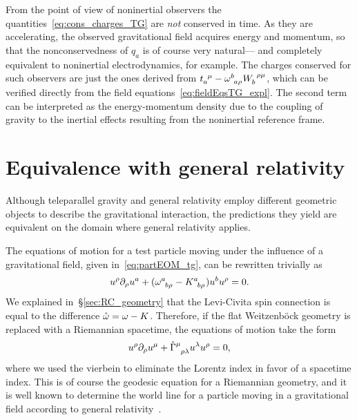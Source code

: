 \documentclass[
final,
11pt,
a4paper,
DIV=11,
headinclude=true,
footinclude=false,
bibliography=totoc,
twoside=true,  %
BCOR=5mm
]{scrbook}
\begin{document}
From the point of view of noninertial observers the 
quantities~\eqref{eq:cons_charges_TG} are \emph{not} conserved in 
time. As they are accelerating, the observed gravitational field 
acquires energy and momentum, so that the nonconservedness of 
$q_a$ is of course very natural--- and completely equivalent to 
noninertial electrodynamics, for example. The charges conserved 
for such observers are just the ones derived from $t\ind{_a^\mu} 
- \omega\ind{^b_{a\rho}} W\ind{_b^{\rho\mu}}$, which can be 
verified directly from the field 
equations~\eqref{eq:fieldEqsTG_expl}. The second term can be 
interpreted as the energy-momentum density due to the coupling of 
gravity to the inertial effects resulting from the noninertial 
reference frame.


\section{Equivalence with general relativity}
\label{sec:equiv_TG_GR}

Although teleparallel gravity and general relativity employ 
different geometric objects to describe the gravitational 
interaction, the predictions they yield are equivalent on the 
domain where general relativity applies.

The equations of motion for a test particle moving under the 
influence of a gravitational field, given 
in~\eqref{eq:partEOM_tg}, can be rewritten trivially as 
\begin{equation*}
  u^\rho \pd_\rho u^a + ( \omega\ind{^a_{b\rho}} 
  - K\ind{^a_{b\rho}} ) u^b u^\rho = 0.
\end{equation*}
We explained in~\S\ref{sec:RC_geometry} that the Levi-Civita spin 
connection is equal to the difference $\mathring{\omega} = \omega 
- K$. Therefore, if the flat Weitzenb\"ock geometry is replaced 
with a Riemannian spacetime, the equations of motion take the 
form
\begin{equation*}
  u^\rho \pd_\rho u^\mu + \mring{\Gamma}\ind{^\mu_{\rho\lambda}} 
  u^\lambda u^\rho = 0,
\end{equation*}
where we used the vierbein to eliminate the Lorentz index in 
favor of a spacetime index. This is of course the geodesic 
equation for a Riemannian geometry, and it is well known to 
determine the world line for a particle moving in a gravitational 
field according to general relativity~\cite{Wald:1984gr}.
\end{document}
